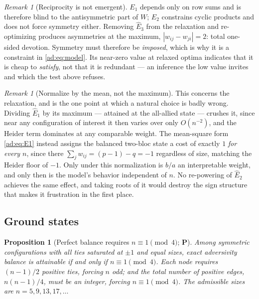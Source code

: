 \documentclass[11pt]{article}
\numberwithin{equation}{section}
\theoremstyle{plain}
\newtheorem{proposition}[theorem]{Proposition}
\theoremstyle{definition}
\theoremstyle{remark}
\newtheorem{remark}[theorem]{Remark}
\begin{document}
\begin{remark}[Reciprocity is not emergent]\label{ad:rem:recip}
$E_1$ depends only on row sums and is therefore blind to the
antisymmetric part of $W$; $E_2$ constrains cyclic products and does not
force symmetry either. Removing $\hat E_3$ from the relaxation and
re-optimizing produces asymmetries at the maximum,
$|w_{ij}-w_{ji}|=2$: total one-sided devotion. Symmetry must therefore
be \emph{imposed}, which is why it is a constraint in
\eqref{ad:eq:model}. Its near-zero value at relaxed optima indicates
that it is cheap to \emph{satisfy}, not that it is redundant --- an
inference the low value invites and which the test above refuses.
\end{remark}

\begin{remark}[Normalize by the mean, not the maximum]
\label{ad:rem:normalisation}
This concerns the relaxation, and is the one point at which a natural
choice is badly wrong. Dividing $\hat E_1$ by its maximum --- attained
at the all-allied state ---
crushes it, since near any configuration of interest it then varies over
only $O(n^{-2})$, and the Heider term dominates at any comparable
weight. The mean-square form \eqref{ad:eq:E1} instead assigns the
balanced two-bloc state a cost of exactly $1$ \emph{for every $n$},
since there $\sum_j w_{ij}=(p-1)-q=-1$ regardless of size, matching the
Heider floor of $-1$. Only under this normalization is $b/a$ an
interpretable weight, and only then is the model's behavior independent
of $n$. No re-powering of $\hat E_2$ achieves the same effect, and
taking roots of it would destroy the sign structure that makes it
frustration in the first place.
\end{remark}

\subsection{Ground states}\label{ad:sub:ground}

\begin{proposition}[Perfect balance requires $n\equiv1\pmod4$;
\textbf{P}]\label{ad:prop:congruence}
Among symmetric configurations with all ties saturated at $\pm1$ and
equal sizes, exact adversivity balance is attainable if and only if
$n\equiv1\pmod4$. Each node requires $(n-1)/2$ positive ties, forcing
$n$ odd; and the total number of positive edges, $n(n-1)/4$, must be an
integer, forcing $n\equiv1\pmod4$. The admissible sizes are
$n=5,9,13,17,\dots$
\end{proposition}
\end{document}
